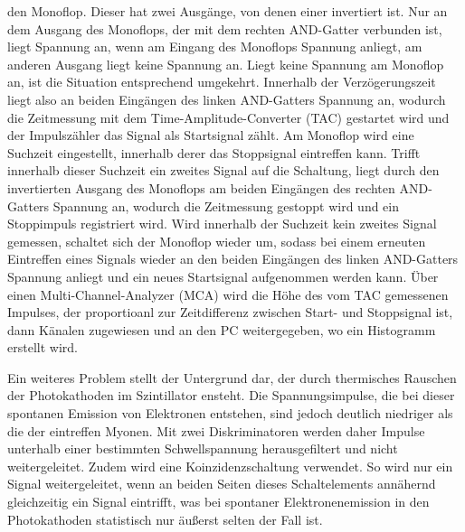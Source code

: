 den Monoflop. Dieser hat zwei Ausgänge, von denen einer invertiert ist. 
Nur an dem Ausgang des Monoflops, der mit dem rechten AND-Gatter verbunden ist, liegt Spannung an, wenn 
am Eingang des Monoflops Spannung anliegt, am anderen Ausgang liegt keine Spannung an. 
Liegt keine Spannung am Monoflop an, ist die Situation entsprechend umgekehrt. 
Innerhalb der Verzögerungszeit liegt also an beiden Eingängen des linken AND-Gatters
Spannung an, wodurch die Zeitmessung mit dem  Time-Amplitude-Converter (TAC)
gestartet wird und der Impulszähler das Signal als Startsignal zählt. Am Monoflop wird eine Suchzeit eingestellt,
innerhalb derer das Stoppsignal eintreffen kann. Trifft innerhalb dieser Suchzeit ein zweites Signal 
auf die Schaltung, liegt durch den invertierten Ausgang des Monoflops am beiden Eingängen des rechten 
AND-Gatters Spannung an, wodurch die Zeitmessung gestoppt wird und ein Stoppimpuls registriert wird. 
Wird innerhalb der Suchzeit kein zweites Signal gemessen, schaltet sich der Monoflop wieder um, sodass 
bei einem erneuten Eintreffen eines Signals wieder an den beiden Eingängen des linken AND-Gatters Spannung
anliegt und ein neues Startsignal aufgenommen werden kann. Über einen Multi-Channel-Analyzer (MCA) wird
die Höhe des vom TAC gemessenen Impulses, der proportioanl zur Zeitdifferenz zwischen Start- und 
Stoppsignal ist, dann Känalen zugewiesen und an den PC weitergegeben, wo ein Histogramm erstellt wird.

Ein weiteres Problem stellt der Untergrund dar, der durch thermisches Rauschen der Photokathoden im Szintillator
ensteht. Die Spannungsimpulse, die bei dieser spontanen Emission von Elektronen entstehen, sind jedoch 
deutlich niedriger als die der eintreffen Myonen. Mit zwei Diskriminatoren werden daher Impulse unterhalb einer 
bestimmten Schwellspannung herausgefiltert und nicht weitergeleitet. Zudem wird eine Koinzidenzschaltung
verwendet. So wird nur ein Signal weitergeleitet, wenn an beiden Seiten dieses Schaltelements 
annähernd gleichzeitig ein Signal eintrifft, was bei spontaner Elektronenemission in den Photokathoden 
statistisch nur äußerst selten der Fall ist.